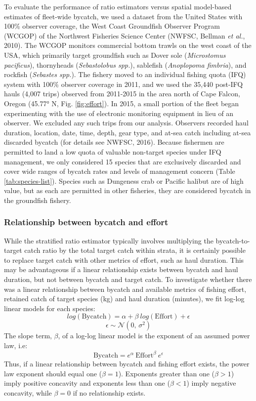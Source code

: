\documentclass[]{article}
\begin{document}
To evaluate the performance of ratio estimators versus spatial
model-based estimates of fleet-wide bycatch, we used a dataset from the
United States with 100\% observer coverage, the West Coast Groundfish
Observer Program (WCGOP) of the Northwest Fisheries Science Center
(NWFSC, Bellman \emph{et al.}, 2010). The WCGOP monitors commercial
bottom trawls on the west coast of the USA, which primarily target
groundfish such as Dover sole (\emph{Microstomus pacificus}),
thornyheads (\emph{Sebastolobus spp.}), sablefish (\emph{Anoplopoma
fimbria}), and rockfish (\emph{Sebastes spp.}). The fishery moved to an
individual fishing quota (IFQ) system with 100\% observer coverage in
2011, and we used the 35,440 post-IFQ hauls (4,007 trips) observed from
2011-2015 in the area north of Cape Falcon, Oregon (45.77° N, Fig.
\ref{fig:effort}). In 2015, a small portion of the fleet began
experimenting with the use of electronic monitoring equipment in lieu of
an observer. We excluded any such trips from our analysis. Observers
recorded haul duration, location, date, time, depth, gear type, and
at-sea catch including at-sea discarded bycatch (for details see NWFSC,
2016). Because fishermen are permitted to land a low quota of valuable
non-target species under IFQ management, we only considered 15 species
that are exclusively discarded and cover wide ranges of bycatch rates
and levels of management concern (Table \ref{tab:species-list}). Species
such as Dungeness crab or Pacific halibut are of high value, but as each
are permitted in other fisheries, they are considered bycatch in the
groundfish fishery.

\subsubsection{Relationship between bycatch and
effort}\label{relationship-between-bycatch-and-effort}

While the stratified ratio estimator typically involves multiplying the
bycatch-to-target catch ratio by the total target catch within strata,
it is certainly possible to replace target catch with other metrics of
effort, such as haul duration. This may be advantageous if a linear
relationship exists between bycatch and haul duration, but not between
bycatch and target catch. To investigate whether there was a linear
relationship between bycatch and available metrics of fishing effort,
retained catch of target species (kg) and haul duration (minutes), we
fit log-log linear models for each species:
\[ log(\text{Bycatch}) = \alpha + \beta \ log(\text{Effort}) + \epsilon\]
\[ \epsilon \sim \mathcal{N}(0,\,\sigma^{2})\] The slope term,
\(\beta\), of a log-log linear model is the exponent of an assumed power
law, i.e:
\[ \text{Bycatch} = e^\alpha \ \text{Effort}^{\beta} \ e^\epsilon\]
Thus, if a linear relationship between bycatch and fishing effort
exists, the power law exponent should equal one (\(\beta = 1\)).
Exponents greater than one (\(\beta > 1\)) imply positive concavity and
exponents less than one (\(\beta < 1\)) imply negative concavity, while
\(\beta = 0\) if no relationship exists.
\end{document}
